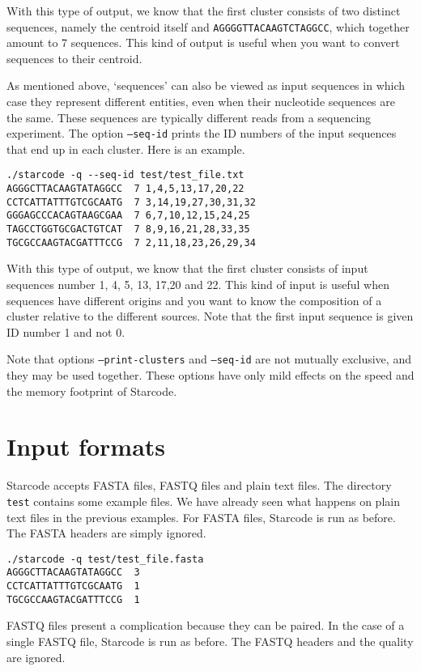 \documentclass[12pt]{article}
\begin{document}
With this type of output, we know that the first cluster
consists of two distinct sequences, namely the centroid itself
and \texttt{AGGGGTTACAAGTCTAGGCC}, which together amount to 7
sequences. This kind of output is useful when you want to convert
sequences to their centroid.

As mentioned above, `sequences' can also be viewed as input sequences
in which case they represent different entities, even when their
nucleotide sequences are the same. These sequences are typically
different reads from a sequencing experiment. The option
\texttt{--seq-id} prints the ID numbers of the input sequences that
end up in each cluster. Here is an example.

\begin{verbatim}
./starcode -q --seq-id test/test_file.txt
AGGGCTTACAAGTATAGGCC  7 1,4,5,13,17,20,22
CCTCATTATTTGTCGCAATG  7 3,14,19,27,30,31,32
GGGAGCCCACAGTAAGCGAA  7 6,7,10,12,15,24,25
TAGCCTGGTGCGACTGTCAT  7 8,9,16,21,28,33,35
TGCGCCAAGTACGATTTCCG  7 2,11,18,23,26,29,34
\end{verbatim}

With this type of output, we know that the first cluster consists of
input sequences number 1, 4, 5, 13, 17,20 and 22. This kind of input
is useful when sequences have different origins and you want to
know the composition of a cluster relative to the different sources.
Note that the first input sequence is given ID number 1 and not 0.

Note that options \texttt{--print-clusters} and \texttt{--seq-id} are
not mutually exclusive, and they may be used together. These options
have only mild effects on the speed and the memory footprint of
Starcode.

\section{Input formats}

Starcode accepts FASTA files, FASTQ files and plain text files.
The directory \texttt{test} contains some example files. We have
already seen what happens on plain text files in the previous
examples. For FASTA files, Starcode is run as before. The FASTA
headers are simply ignored.

\begin{verbatim}
./starcode -q test/test_file.fasta
AGGGCTTACAAGTATAGGCC  3
CCTCATTATTTGTCGCAATG  1
TGCGCCAAGTACGATTTCCG  1
\end{verbatim}

FASTQ files present a complication because they can be paired.
In the case of a single FASTQ file, Starcode is run as before.
The FASTQ headers and the quality are ignored.
\end{document}
